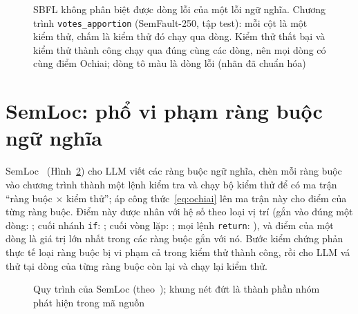 \begin{figure}[H]
\centering

\caption{SBFL không phân biệt được dòng lỗi của một lỗi ngữ nghĩa. Chương trình \texttt{votes\_apportion} (SemFault-250, tập test): mỗi cột là một kiểm thử, chấm là kiểm thử đó chạy qua dòng. Kiểm thử thất bại và kiểm thử thành công chạy qua đúng cùng các dòng, nên mọi dòng có cùng điểm Ochiai; dòng tô màu là dòng lỗi (nhãn đã chuẩn hóa)}
\label{fig:sbfl-mu}
\end{figure}

\section{SemLoc: phổ vi phạm ràng buộc ngữ nghĩa}
\label{sec:semloc}

SemLoc~\cite{yang2026semloc} (Hình~\ref{fig:semloc}) cho LLM viết các ràng buộc ngữ nghĩa, chèn mỗi ràng buộc vào
chương trình thành một lệnh kiểm tra và chạy bộ kiểm thử để có ma trận ``ràng buộc $\times$ kiểm thử''; áp
công thức~\eqref{eq:ochiai} lên ma trận này cho điểm của từng ràng buộc. Điểm này được nhân với hệ số theo loại vị trí (gắn vào đúng một dòng: \ConstRegionWeightLine; cuối nhánh
\texttt{if}: \ConstRegionWeightAfterBranch; cuối vòng lặp: \ConstRegionWeightLoopTail; mọi lệnh \texttt{return}:
\ConstRegionWeightAnyReturn), và điểm của một dòng là giá trị lớn nhất trong các ràng buộc gắn với nó. Bước kiểm chứng
phản thực tế loại ràng buộc bị vi phạm cả trong kiểm thử thành công, rồi cho LLM vá thử tại dòng của từng ràng buộc còn
lại và chạy lại kiểm thử.

\begin{figure}[H]
\centering
{%
}
\caption{Quy trình của SemLoc (theo~\cite{yang2026semloc}); khung nét đứt là thành phần nhóm phát hiện trong mã nguồn}
\label{fig:semloc}
\end{figure}

